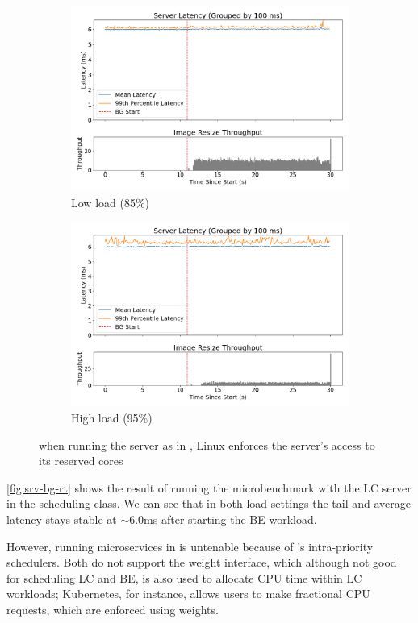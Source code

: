 \begin{figure}[t]
    \centering
    \begin{subfigure}[t]{\columnwidth}
        \includegraphics[width=\columnwidth]{graphs/srv-bg-rt-low.png}
        \caption{Low load (85\%)}\label{fig:srv-bg-rt-low}
        \vspace{12pt}
    \end{subfigure}
    \hspace{\fill}
    \begin{subfigure}[t]{\columnwidth}
        \includegraphics[width=\columnwidth]{graphs/srv-bg-rt-high.png}
        \caption{High load (95\%)}\label{fig:srv-bg-rt-high}
    \end{subfigure}
    \vspace{4pt}
    \caption{when running the server as in \rtclass{}, Linux enforces the
     server's access to its reserved cores}\label{fig:srv-bg-rt}
\end{figure}

\autoref{fig:srv-bg-rt} shows the result of running the microbenchmark with the
LC server in the \rtclass{} scheduling class. We can see that in both load
settings the tail and average latency stays stable at $\sim$6.0ms after starting
the BE workload.

However, running microservices in \rtclass{} is untenable because of
\rtclass{}'s intra-priority schedulers. Both do not support the \cgroups{}
weight interface, which although not good for scheduling LC and BE, is also used
to allocate CPU time within LC workloads; Kubernetes, for instance, allows users
to make fractional CPU requests, which are enforced using weights.